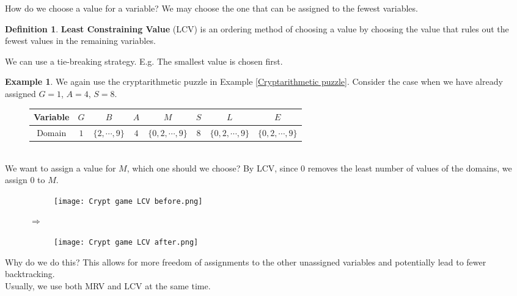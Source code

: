 \documentclass{article}
\theoremstyle{definition}
\newtheorem{definition}{Definition}[section]
\newtheorem{example}{Example}[definition]
\begin{document}
How do we choose a value for a variable? We may choose the one that can be assigned to the fewest variables.
\begin{definition}
	\textbf{Least Constraining Value} (LCV) is an ordering method of choosing a value by choosing the value that rules out the fewest values in the remaining variables.
\end{definition}
We can use a tie-breaking strategy. E.g. The smallest value is chosen first.
\begin{example}
	\label{LCV}
	We again use the cryptarithmetic puzzle in Example \ref{Cryptarithmetic puzzle}. Consider the case when we have already assigned $G=1$, $A=4$, $S=8$. 
	\begin{figure}[h]
		\centering
		\begin{tabular}{|c||c|c|c|c|c|c|c|}
			\hline
			Variable & $G$ & $B$ & $A$ & $M$ & $S$ & $L$ & $E$\\
			\hline
			Domain & $1$ & $\{2,\cdots,9\}$ & $4$ & $\{0,2,\cdots,9\}$ & $8$ & $\{0,2,\cdots,9\}$ & $\{0,2,\cdots,9\}$\\
			\hline
		\end{tabular}
	\end{figure}\\
	We want to assign a value for $M$, which one should we choose? By LCV, since $0$ removes the least number of values of the domains, we assign $0$ to $M$.
	\begin{figure}[h!]
		\centering
		\begin{subfigure}[h]{0.3\textwidth}
			\texttt{[image: Crypt game LCV before.png]}
		\end{subfigure}
		$\Longrightarrow$
		\begin{subfigure}[h]{0.3\textwidth}
			\texttt{[image: Crypt game LCV after.png]}
		\end{subfigure}
	\end{figure}
\end{example}
Why do we do this? This allows for more freedom of assignments to the other unassigned variables and potentially lead to fewer backtracking.\\
Usually, we use both MRV and LCV at the same time.

\newpage
\end{document}
